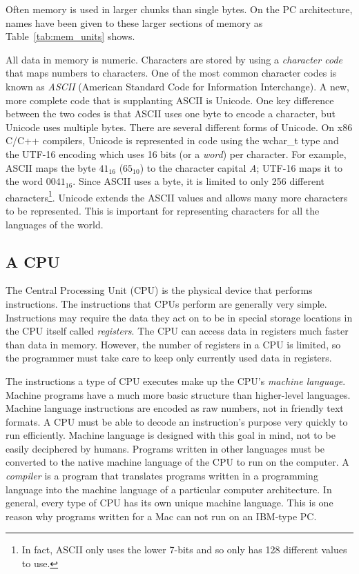 Often memory is used in larger chunks than single bytes. On
the PC architecture, names have been given to these larger sections of
memory as Table~\ref{tab:mem_units} shows.

All data in memory is numeric. Characters are stored by using a
\emph{character code} that maps numbers to characters. One of the
most common character codes is known as \emph{ASCII} (American
Standard Code for Information Interchange). A new, more complete code
that is supplanting ASCII is Unicode. One key difference between the
two codes is that ASCII uses one byte to encode a character, but
Unicode uses multiple bytes. There are several different forms of Unicode.
On x86 C/C++ compilers, Unicode is represented in code using the
{\code wchar\_t} type and the UTF-16 encoding which uses 16 bits (or a
\emph{word}) per character. For example, ASCII maps the byte $41_{16}$
($65_{10}$) to the character capital \emph{A}; UTF-16 maps it to the
word $0041_{16}$. Since ASCII uses a byte, it is limited to only 256
different characters\footnote{In fact, ASCII only uses the lower 7-bits
and so only has 128 different values to use.}. Unicode extends the ASCII
values and allows many more characters to be represented. This is important
for representing characters for all the languages of the world.

\subsection{A CPU}

The Central Processing Unit (CPU) is the physical device that performs
instructions. The instructions that CPUs perform are generally very
simple. Instructions may require the data they act on to be in special
storage locations in the CPU itself called
\emph{registers}.  The CPU can access data in registers
much faster than data in memory. However, the number of registers in a
CPU is limited, so the programmer must take care to keep only
currently used data in registers.

The instructions a type of CPU executes make up the CPU's
\emph{machine language}.  Machine programs
have a much more basic structure than higher-level languages. Machine
language instructions are encoded as raw numbers, not in friendly text
formats. A CPU must be able to decode an instruction's purpose very
quickly to run efficiently. Machine language is designed with this
goal in mind, not to be easily deciphered by humans. Programs written
in other languages must be converted to the native machine language of
the CPU to run on the computer. A \emph{compiler}  is
a program that translates programs written in a programming language
into the machine language of a particular computer architecture. In
general, every type of CPU has its own unique machine language. This
is one reason why programs written for a Mac can not run on an
IBM-type PC.

